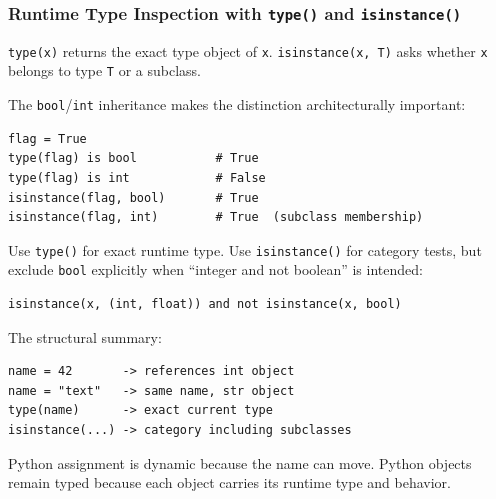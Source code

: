\subsubsection{Runtime Type Inspection with \texttt{type()} and \texttt{isinstance()}}

\texttt{type(x)} returns the exact type object of \texttt{x}. \texttt{isinstance(x, T)} asks whether \texttt{x} belongs to type \texttt{T} or a subclass.

The \texttt{bool}/\texttt{int} inheritance makes the distinction architecturally important:

\begin{verbatim}
flag = True
type(flag) is bool           # True
type(flag) is int            # False
isinstance(flag, bool)       # True
isinstance(flag, int)        # True  (subclass membership)
\end{verbatim}

Use \texttt{type()} for exact runtime type. Use \texttt{isinstance()} for category tests, but exclude \texttt{bool} explicitly when ``integer and not boolean'' is intended:

\begin{verbatim}
isinstance(x, (int, float)) and not isinstance(x, bool)
\end{verbatim}

The structural summary:

\begin{verbatim}
name = 42       -> references int object
name = "text"   -> same name, str object
type(name)      -> exact current type
isinstance(...) -> category including subclasses
\end{verbatim}

Python assignment is dynamic because the name can move. Python objects remain typed because each object carries its runtime type and behavior.
